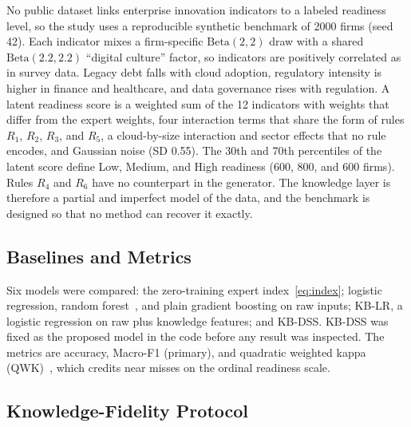 \documentclass[10pt,journal,compsoc]{IEEEtran}
\begin{document}
No public dataset links enterprise innovation indicators to a labeled readiness level, so the study uses a reproducible synthetic benchmark of 2000 firms (seed 42). Each indicator mixes a firm-specific \(\mathrm{Beta}(2,2)\) draw with a shared \(\mathrm{Beta}(2.2,2.2)\) ``digital culture'' factor, so indicators are positively correlated as in survey data. Legacy debt falls with cloud adoption, regulatory intensity is higher in finance and healthcare, and data governance rises with regulation. A latent readiness score is a weighted sum of the 12 indicators with weights that differ from the expert weights, four interaction terms that share the form of rules \(R_1\), \(R_2\), \(R_3\), and \(R_5\), a cloud-by-size interaction and sector effects that no rule encodes, and Gaussian noise (SD 0.55). The 30th and 70th percentiles of the latent score define Low, Medium, and High readiness (600, 800, and 600 firms). Rules \(R_4\) and \(R_6\) have no counterpart in the generator. The knowledge layer is therefore a partial and imperfect model of the data, and the benchmark is designed so that no method can recover it exactly.

\subsection{Baselines and Metrics}

Six models were compared: the zero-training expert index~\eqref{eq:index}; logistic regression, random forest~\cite{breiman2001}, and plain gradient boosting on raw inputs; KB-LR, a logistic regression on raw plus knowledge features; and KB-DSS. KB-DSS was fixed as the proposed model in the code before any result was inspected. The metrics are accuracy, Macro-F1 (primary), and quadratic weighted kappa (QWK)~\cite{cohen1968}, which credits near misses on the ordinal readiness scale.

\subsection{Knowledge-Fidelity Protocol}
\end{document}
